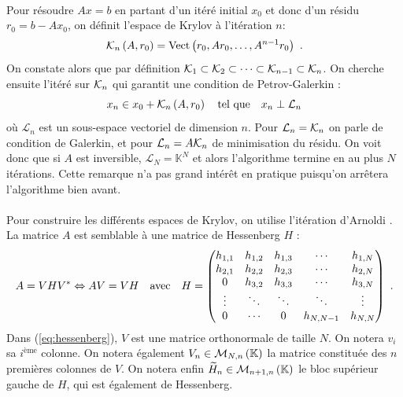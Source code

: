 	\paragraph{}
	Pour résoudre $Ax = b$ en partant d'un itéré initial $x_0$ et donc d'un résidu $r_0 = b - Ax_0$, on définit l'espace de Krylov à l'itération $n$:
	\begin{equation}\label{eqn:krylov}
		\krylov[A, r_0]{n} = \operatorname{Vect}\left(r_0, Ar_0, \dots, A^{n-1}r_0\right)\ .
	\end{equation}
	On constate alors que par définition $\krylov{1}\subset\krylov{2}\subset\dots\subset\krylov{n-1}\subset\krylov{n}$.
	On cherche ensuite l'itéré sur $\krylov{n}$ qui garantit une condition de Petrov-Galerkin \cite{SimonciniSzyld2007} :
	\begin{equation}\label{eqn:x_n}
		x_n \in x_0 + \krylov[A, r_0]{n}\quad\textrm{tel que}\quad x_n \perp \mathcal{L}_n
	\end{equation}
	où $\mathcal{L}_n$ est un sous-espace vectoriel de dimension $n$.
	Pour $\mathcal{L}_n = \krylov{n}$ on parle de condition de Galerkin, et pour $\mathcal{L}_n = A\krylov{n}$ de minimisation du résidu.
	On voit donc que si $A$ est inversible, $\mathcal{L}_N = \mathbb{K}^N$ et alors l'algorithme termine en au plus $N$ itérations.
	Cette remarque n'a pas grand intérêt en pratique puisqu'on arrêtera l'algorithme bien avant.

	\paragraph{}
	Pour construire les différents espaces de Krylov, on utilise l'itération d'Arnoldi \cite{TrefethenBau1997}.
	La matrice $A$ est semblable à une matrice de Hessenberg $H$ :
	\begin{equation}\label{eq:hessenberg}
		A = VH{V}^*\Leftrightarrow AV = VH\quad\textrm{avec}\quad H=
		\begin{pmatrix}
			h_{1,1}&h_{1,2}&h_{1,3}&\cdots &h_{1,N}\\
			h_{2,1}&h_{2,2}&h_{2,3}&\cdots &h_{2,N}\\
			0      &h_{3,2}&h_{3,3}&\cdots &h_{3,N}\\
			\vdots &\ddots &\ddots &\ddots &\vdots \\
			0      &\cdots &0      &h_{N,N-1}&h_{N,N}
		\end{pmatrix}\ .
	\end{equation}
	Dans (\ref{eq:hessenberg}), $V$ est une matrice orthonormale de taille $N$.
	On notera $v_i$ sa $i^{\textrm{ème}}$ colonne.
	On notera également $V_n\in\mathcal{M}_{N, n}\left(\mathbb{K}\right)$ la matrice constituée des $n$ premières colonnes de $V$.
	On notera enfin $\widetilde{H}_n\in\mathcal{M}_{n+1, n}\left(\mathbb{K}\right)$ le bloc supérieur gauche de $H$, qui est également de Hessenberg.

